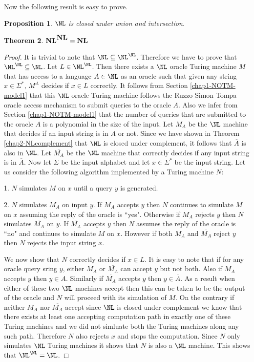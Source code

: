 \documentclass{amsbook}
\newtheorem{theorem}{Theorem}[chapter]
\newtheorem{proposition}[theorem]{Proposition}
\theoremstyle{definition}
\theoremstyle{remark}
\numberwithin{section}{chapter}
\numberwithin{equation}{chapter}
\newcommand{\boldNL}{\mbox{\rm \bf NL}}
\begin{document}
Now the following result is easy to prove.
\begin{proposition}\label{nlunionintersection}
$\NL$ is closed under union and intersection.
\end{proposition}

\begin{theorem}\label{chap2-NLhierarchycollapses}
$\boldNL^{\boldNL}=\boldNL$
\end{theorem}
\begin{proof}
It is trivial to note that $\NL\subseteq\NL^{\rm{\NL}}$. Therefore we have to prove that $\NL^\NL\subseteq\NL$. Let $L\in\NL^\NL$. Then there exists a $\NL$ oracle Turing machine $M$ that has access to a language $A\in\NL$ as an oracle such that given any string $x\in\Sigma^*$, $M^A$ decides if $x\in L$ correctly. It follows from Section \ref{chap1-NOTM-model1} that this $\NL$ oracle Turing machine follows the Ruzzo-Simon-Tompa oracle access mechanism to submit queries to the oracle $A$. Also we infer from Section \ref{chap1-NOTM-model1} that the number of queries that are submitted to the oracle $A$ is a polynomial in the size of the input. Let $M_A$ be the $\NL$ machine that decides if an input string is in $A$ or not. Since we have shown in Theorem \ref{chap2-NLcomplement} that $\NL$ is closed under complement, it follows that $\overline{A}$ is also in $\NL$. Let $\overline{M_A}$ be the $\NL$ machine that correctly decides if any input string is in $\overline{A}$. Now let $\Sigma$ be the input alphabet and let $x\in\Sigma^*$ be the input string. Let us consider the following algorithm implemented by a Turing machine $N$: 

1. $N$ simulates $M$ on $x$ until a query $y$ is generated.

2. $N$ simulates $M_A$ on input $y$. If $M_A$ accepts $y$ then $N$ continues to simulate $M$ on $x$ assuming the reply of the oracle is ``yes". Otherwise if $M_A$ rejects $y$ then $N$ simulates $\overline{M_A}$ on $y$. If $\overline{M_A}$ accepts $y$ then $N$ assumes the reply of the oracle is ``no" and continues to simulate $M$ on $x$. However if both $M_A$ and $\overline{M_A}$ reject $y$ then $N$ rejects the input string $x$.

We now show that $N$ correctly decides if $x\in L$. It is easy to note that if for any oracle query sring $y$, either $M_A$ or $\overline{M_A}$ can accept $y$ but not both. Also if $M_A$ accepts $y$ then $y\in A$. Similarly if $\overline{M_A}$ accepts $y$ then $y\in\overline{A}$. As a result when either of these two $\NL$ machines accept then this can be taken to be the output of the oracle and $N$ will proceed with its simulation of $M$. On the contrary if neither $M_A$ nor $\overline{M_A}$ accept since $\NL$ is closed under complement we know that there exists at least one accepting computation path in exactly one of these Turing machines and we did not simluate both the Turing machines along any such path. Therefore $N$ also rejects $x$ and stops the computation. Since $N$ only simulates $\NL$ Turing machines it shows that $N$ is also a $\NL$ machine. This shows that $\NL^{\NL}=\NL$.
\end{proof}
\end{document}
